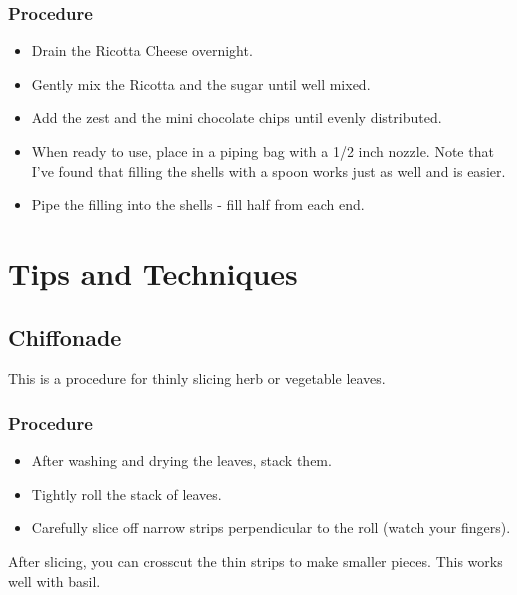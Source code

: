 \documentclass[10pt, openany]{book}
\begin{document}
\subsection{Procedure}
\begin{itemize}
  \item Drain the Ricotta Cheese overnight.
  \item Gently mix the Ricotta and the sugar until well mixed.
  \item Add the zest and the mini chocolate chips until evenly distributed.
  \item When ready to use, place in a piping bag with a 1/2 inch nozzle.  Note that I've found that filling the shells with a spoon works just as well and is easier.
  \item Pipe the filling into the shells - fill half from each end.
\end{itemize}

\chapter{Tips and Techniques}

\section{Chiffonade}
\label{tip:Chiffonade}
This is a procedure for thinly slicing herb or vegetable leaves.
\subsection{Procedure}
\begin{itemize}
  \item After washing and drying the leaves, stack them.
  \item Tightly roll the stack of leaves.
  \item Carefully slice off narrow strips perpendicular to the roll (watch your fingers).
\end{itemize}
After slicing, you can crosscut the thin strips to make smaller pieces.  This works well with basil.

\end{document}
